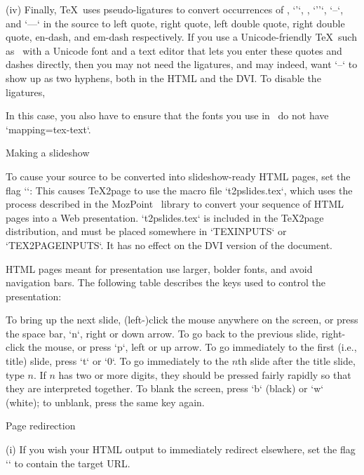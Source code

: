 \item(iv) Finally, \TeX\ uses pseudo-ligatures to convert occurrences of , `'`, , `''`, `--`, and `---`
in the source to left quote, right quote, left double quote, right double quote, en-dash, and em-dash respectively.
If you use a Unicode-friendly \TeX\ such as \XeTeX\ with a Unicode font and a text editor that lets you enter these quotes and dashes directly, then you may
not need the ligatures, and may indeed, want `--` to show up as two hyphens, both in the HTML and the DVI.  To disable the ligatures,

\begintt
\let\TZPtextext=0
\endtt
%
In this case, you also have to ensure that the fonts you use in \XeTeX\ do not have `mapping=tex-text`.

\beginsection Making a slideshow

%
To cause your source to be converted into slideshow-ready HTML pages,
set the flag `\TZPslides`:
\begintt
\let\TZPslides=1
\endtt
%
This causes \TeX2page to use the macro file
`t2pslides.tex`, which uses the process described in
the MozPoint~\cite{mozpoint} library
to convert your sequence of HTML
pages into a Web presentation.  `t2pslides.tex` is included in the
\TeX2page distribution, and must be placed
somewhere in `TEXINPUTS` or `TEX2PAGEINPUTS`.  It has no
effect on the DVI version of the document.

HTML pages meant for presentation use larger, bolder fonts, and
avoid navigation bars.  The following table describes the keys used to
control the presentation:

To bring up the next slide, (left-)click the mouse
anywhere  on the screen, or press the space bar, `n`, right or down
arrow.  To go back to the previous slide, right-click the
mouse, or press `p`, left or up arrow.
To go immediately to the first (i.e., title) slide, press `t` or `0`.  To go
immediately to the $n$th slide after the title slide, type $n$.  If $n$ has
two or more digits, they should be pressed fairly rapidly so that they are
interpreted together.  To blank the screen, press `b`
(black) or `w` (white); to unblank, press the same key again.

\beginsection Page redirection

\item(i) If you wish your HTML output to immediately redirect elsewhere,
set the flag `\TZPredirect` to contain the target URL.

